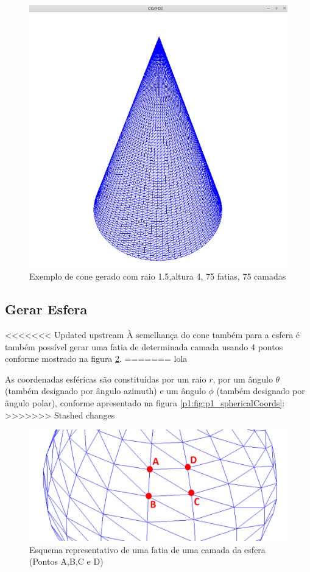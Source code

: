 \begin{figure}[htpb]
	\centering
	\includegraphics[scale=0.5]{imagens/print_cone_raio1-5_altura4_slices75_stacks75}
	\caption{Exemplo de cone gerado com raio 1.5,altura 4, 75 fatias, 75 camadas}
	\label{p1:fig:p3_cone_2_3_10_10}
\end{figure}


\newpage
\subsection{Gerar Esfera}

<<<<<<< Updated upstream
À semelhança do cone também para a esfera é também possível gerar uma fatia de determinada camada usando 4 pontos conforme mostrado na figura \ref{p1:fig:p3_esferaSeccao_edit}.
=======
lola

As coordenadas esféricas são constituídas por um raio $r$, por um ângulo $\theta$ (também designado por ângulo azimuth) e um ângulo $\phi$ (também designado por ângulo polar), conforme apresentado na figura \ref{p1:fig:p1_sphericalCoords}:
>>>>>>> Stashed changes

\begin{figure}[htpb]
	\centering
	\includegraphics[scale=0.5]{imagens/p3_esferaSeccao_edit.png}
	\caption{Esquema representativo de uma fatia de uma camada da esfera (Pontos A,B,C e D)}
	\label{p1:fig:p3_esferaSeccao_edit}
\end{figure}



